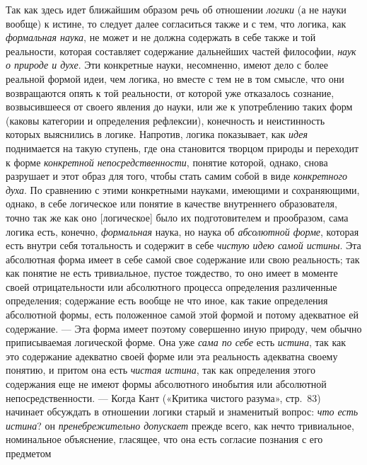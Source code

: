 \documentclass[twoside]{article}
\begin{document}
{{Так как здесь идет ближайшим образом речь об отношении
{\em логики} (а не науки
вообще) к истине, то следует далее согласиться также и с тем, что логика,
как {\em формальная наука},
не может и не должна содержать в себе также и той реальности,
которая составляет содержание дальнейших частей философии,
{\em наук о природе и духе}.
Эти конкретные науки, несомненно, имеют дело с более реальной
формой идеи, чем логика, но вместе с тем не в том смысле, что они
возвращаются опять к той реальности, от которой уже отказалось сознание,
возвысившееся от своего явления до науки, или же к употреблению таких форм
(каковы категории и определения рефлексии), конечность и неистинность
которых выяснились в логике. Напротив, логика показывает, как
{\em идея} поднимается на
такую ступень, где она становится творцом природы и переходит к форме
{\em конкретной непосредственности},
понятие которой, однако, снова разрушает и этот образ для
того, чтобы стать самим собой в виде
{\em конкретного духа}.
По сравнению с этими конкретными науками, имеющими и
сохраняющими, однако, в себе логическое или понятие в качестве внутреннего
образователя, точно так же как оно [логическое] было их подготовителем и
прообразом, сама логика есть, конечно,
{\em формальная} наука,
но наука об {\em абсолютной форме},
которая есть внутри себя тотальность и содержит в себе
{\em чистую идею самой истины}.
Эта абсолютная форма имеет в себе самой свое содержание или
свою реальность; так как понятие не есть тривиальное, пустое тождество, то
оно имеет в моменте своей отрицательности или абсолютного процесса
определения различенные определения; содержание есть вообще не что иное,
как такие определения абсолютной формы, есть положенное самой этой формой и
потому адекватное ей содержание. — Эта форма имеет поэтому
совершенно иную природу, чем обычно приписываемая логической
форме. Она уже {\em сама по себе}
есть {\em истина},
так как это содержание адекватно своей форме или эта
реальность адекватна своему понятию, и притом она есть
{\em чистая истина}, так
как определения этого содержания еще не имеют формы абсолютного инобытия
или абсолютной непосредственности. — Когда Кант («Критика
чистого разума», стр.~83) начинает обсуждать в отношении логики старый и
знаменитый вопрос: {\em что есть
истина}? он
{\em пренебрежительно допускает
}прежде всего, как нечто тривиальное, номинальное
объяснение, гласящее, что она есть согласие познания с его
предметом~}}
\end{document}

